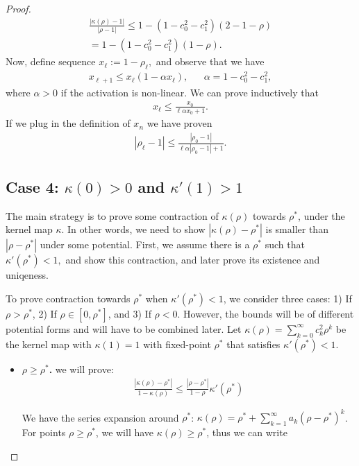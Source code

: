 \documentclass[twoside]{article}
\theoremstyle{definition}
\begin{document}
\begin{proof}
\begin{align*}
    \frac{|\kappa(\rho)-1|}{|\rho-1|} \le 1-(1-c_0^2-c_1^2)(2-1-\rho) \\
    = 1- (1-c_0^2-c_1^2) (1-\rho).
\end{align*}
Now, define sequence $x_\ell:= 1-\rho_\ell,$ and observe that we have 
\begin{align*}
    x_{\ell+1} \le x_\ell (1-\alpha x_\ell), && \alpha = 1-c_0^2-c_1^2,
\end{align*}
where $\alpha > 0$ if the activation is non-linear. 
We can prove inductively that 
\begin{align*}
x_\ell\le \frac{x_0}{\ell\alpha x_0 + 1}.
\end{align*}
If we plug in the definition of $x_n$ we have proven
\begin{align*}
|\rho_\ell-1| \le \frac{|\rho_0-1|}{\ell \alpha |\rho_0-1| + 1}.
\end{align*}

\subsection*{Case 4: $\kappa(0)>0$ and $\kappa'(1)>1$}
The main strategy is to prove some contraction of $\kappa(\rho)$ towards $\rho^*$, under the kernel map $\kappa$. In other words, we need to show $|\kappa(\rho)-\rho^*|$ is smaller than $|\rho-\rho^*|$ under some potential. First, we assume there is a $\rho^*$ such that $\kappa'(\rho^*)<1,$ and show this contraction, and later prove its existence and uniqeness. 

To prove contraction towards $\rho^*$ when $\kappa'(\rho^*)<1$, we consider three cases: 1) If $\rho > \rho^*$, 2) If $\rho \in [0,\rho^*]$, and 3) If $\rho < 0$. However, the bounds will be of different potential forms and will have to be combined later.  Let $\kappa(\rho) = \sum_{k=0}^\infty c_k^2 \rho^k$ be the kernel map with $\kappa(1)= 1$ with fixed-point $\rho^*$ that satisfies $\kappa'(\rho^*)<1.$

\begin{itemize}
\item \textbf{$\rho\ge \rho^*$.} we will prove:
\begin{align*}
\frac{|\kappa(\rho)-\rho^*|}{1-\kappa(\rho)} \le \frac{|\rho-\rho^*|}{1-\rho} \kappa'(\rho^*)
\end{align*}

We have the series expansion around $\rho^*$: $\kappa(\rho) = \rho^* + \sum_{k=1}^\infty a_k (\rho-\rho^*)^k$. For points $\rho\ge \rho^*$, we will have $\kappa(\rho)\ge \rho^*$, thus we can write


\end{itemize}
\end{proof}
\end{document}
